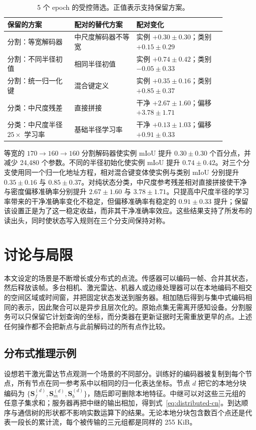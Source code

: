 \documentclass[UTF8,a4paper,11pt,fontset=windows]{ctexart}
\newcommand{\Sstate}{\mathbf{S}}
\begin{document}
\begin{table}[t]
\centering
\caption{5 个 epoch 的受控筛选。正值表示支持保留方案。}
\label{tab:screens-cn}
\small
\begin{tabular}{p{0.27\linewidth}p{0.25\linewidth}p{0.36\linewidth}}
\toprule
保留的方案 & 配对的替代方案 & 配对变化\\
\midrule
分割：等宽解码器 & 中尺度解码器不等宽 & 实例 $+0.30\pm0.30$；类别 $+0.15\pm0.29$\\
分割：不同半径初值 & 相同半径初值 & 实例 $+0.74\pm0.42$；类别 $-0.05\pm0.33$\\
分割：统一归一化键 & 混合键定义 & 实例 $+0.35\pm0.16$；类别 $+0.85\pm0.37$\\
分类：中尺度残差 & 直接拼接 & 干净 $+2.67\pm1.60$；偏移 $+3.78\pm1.71$\\
分类：中尺度半径 $25\times$ 学习率 & 基础半径学习率 & 干净 $+0.13\pm1.03$；偏移 $+0.91\pm0.33$\\
\bottomrule
\end{tabular}
\end{table}

等宽的 $170\rightarrow160\rightarrow160$ 分割解码器使实例 mIoU 提升 $0.30\pm0.30$ 个百分点，并减少 24,480 个参数。不同的半径初始化使实例 mIoU 提升 $0.74\pm0.42$。对三个分支使用同一个归一化地址方程，相对混合键变体使实例与类别 mIoU 分别提升 $0.35\pm0.16$ 与 $0.85\pm0.37$。对纯状态分类，中尺度参考残差相对直接拼接使干净与密度偏移准确率分别提升 $2.67\pm1.60$ 与 $3.78\pm1.71$。只提高中尺度半径的学习率带来的干净准确率变化不稳定，但偏移准确率有稳定的 $0.91\pm0.33$ 提升；保留该设置正是为了这一稳定收益，而非其干净准确率效应。这些结果支持了所发布的读出头，同时使状态写入规则在三个分支间保持对称。

\section{讨论与局限}
本文设定的场景是不断增长或分布式的点流。传感器可以编码一帧、合并其状态，然后释放该帧。多台相机、激光雷达、机器人或边缘处理器可以在本地编码不相交的空间区域或时间窗，并把固定状态发送到服务器。相加随后得到与集中式编码相同的表示，因此聚合可以是异步且层次化的。原始点集无需离开感知设备。分割服务可以只保留它计划查询的坐标，而分类器在更新证据时无需重放更早的点。上述任何操作都不会把新点与此前解码过的所有点作比较。

\subsection{分布式推理示例}
设想若干激光雷达节点观测一个场景的不同部分。训练好的编码器被复制到每个节点，所有节点在同一参考系中以相同的归一化表达坐标。节点 $d$ 把它的本地分块编码为 $\{\Sstate_f^{(d)},\Sstate_m^{(d)},\Sstate_b^{(d)}\}$，随后即可删除本地特征。中继可以对这些三元组的任意子集求和；服务器再把中继的输出相加，得到式~\eqref{eq:distributed-cn}。到达顺序与通信树的形状都不影响实数运算下的结果。无论本地分块包含数百个点还是代表一段长的累计流，每个被传输的三元组都是同样的 255 KiB。
\end{document}
